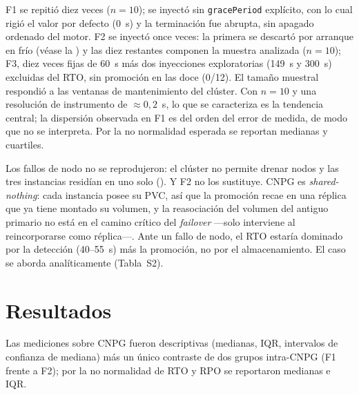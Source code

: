 F1 se repitió diez veces ($n=10$); se inyectó sin \texttt{gracePeriod} explícito, con lo cual rigió el valor por defecto (0~s) y la terminación fue abrupta, sin apagado ordenado del motor. F2 se inyectó once veces: la primera se descartó por arranque en frío (véase la ) y las diez restantes componen la muestra analizada ($n=10$); F3, diez veces fijas de 60~s más dos inyecciones exploratorias (149~s y 300~s) excluidas del RTO, sin promoción en las doce (0/12). El tamaño muestral respondió a las ventanas de mantenimiento del clúster. Con $n=10$ y una resolución de instrumento de $\approx0{,}2$~s, lo que se caracteriza es la tendencia central; la dispersión observada en F1 es del orden del error de medida, de modo que no se interpreta. Por la no normalidad esperada se reportan medianas y cuartiles.

Los fallos de nodo no se reprodujeron: el clúster no permite drenar nodos y las tres instancias residían en uno solo (). Y F2 no los sustituye. CNPG es \emph{shared-nothing}: cada instancia posee su PVC, así que la promoción recae en una réplica que ya tiene montado su volumen, y la reasociación del volumen del antiguo primario no está en el camino crítico del \textit{failover} —solo interviene al reincorporarse como réplica—. Ante un fallo de nodo, el RTO estaría dominado por la detección (40--55~s) más la promoción, no por el almacenamiento. El caso se aborda analíticamente (Tabla~S2).

\section{Resultados}\label{sec:res}
Las mediciones sobre CNPG fueron descriptivas (medianas, IQR, intervalos de confianza de mediana) más un único contraste de dos grupos intra-CNPG (F1 frente a F2); por la no normalidad de RTO y RPO se reportaron medianas e IQR.

